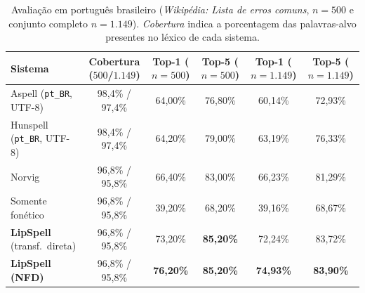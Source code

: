 \documentclass[a4paper, twocolumn, 11pt, twoside]{article}
\begin{document}
\begin{table}[ht]
\centering
\scriptsize
\setlength{\tabcolsep}{3.5pt}
\caption{Avaliação em português brasileiro (\textit{Wikipédia: Lista de erros comuns}, $n=500$ e conjunto completo $n=1.149$). \textit{Cobertura} indica a porcentagem das palavras-alvo presentes no léxico de cada sistema.}
\label{tab:ptbr}
\begin{tabular}{lccccc}
\toprule
Sistema & Cobertura ($500$/$1.149$) & Top-1 ($n=500$) & Top-5 ($n=500$) & Top-1 ($n=1.149$) & Top-5 ($n=1.149$) \\
\midrule
Aspell (\texttt{pt\_BR}, UTF-8)   & 98,4\% / 97,4\% & 64,00\% & 76,80\% & 60,14\% & 72,93\% \\
Hunspell (\texttt{pt\_BR}, UTF-8) & 98,4\% / 97,4\% & 64,20\% & 79,00\% & 63,19\% & 76,33\% \\
Norvig                     & 96,8\% / 95,8\% & 66,40\% & 83,00\% & 66,23\% & 81,29\% \\
Somente fonético           & 96,8\% / 95,8\% & 39,20\% & 68,20\% & 39,16\% & 68,67\% \\
\textbf{LipSpell} (transf.\ direta) & 96,8\% / 95,8\% & 73,20\% & \textbf{85,20\%} & 72,24\% & 83,72\% \\
\textbf{LipSpell (NFD)}            & 96,8\% / 95,8\% & \textbf{76,20\%} & \textbf{85,20\%} & \textbf{74,93\%} & \textbf{83,90\%} \\
\bottomrule
\end{tabular}
\end{table}
\end{document}
